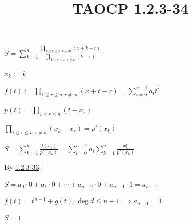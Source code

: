\documentclass{article}
\title{TAOCP 1.2.3\mbox{-}34}
\begin{document}
\maketitle

\( S = \sum_{k=1}^{n} \frac{\prod_{1 \leq r \leq n, r \neq m} (x + k - r)}{\prod_{1 \leq r \leq n, r \neq k} (k - r)} \)

\( x_{k} := k \)

\( f(t) := \prod_{1 \leq r \leq n, r \neq m} (x + t - r) = \sum_{i=0}^{n-1} a_{i}t^{i} \)

\( p(t) = \prod_{1 \leq r \leq n} (t-x_{r}) \)

\( \prod_{1 \leq r \leq n, r \neq k} (x_{k} - x_{r}) = p'(x_{k}) \)

\( S = \sum_{k=1}^{n} \frac{f(x_{k})}{p'(x_{k})} = \sum_{i=0}^{n-1} a_{i} \sum_{k=1}^{n} \frac{x_{k}^{i}}{p'(x_{k})} \)

By \href{./1.2.3-33.pdf}{1.2.3\mbox{-}33}:

\( S = a_{0} \cdot 0 + a_{1} \cdot 0 + \cdots + a_{n-2} \cdot 0 + a_{n-1} \cdot 1 = a_{n-1} \)

\( f(t) = t^{n-1} + g(t), \deg d \leq n - 1 \implies a_{n-1} = 1 \)

\( S = 1 \)
\end{document}
